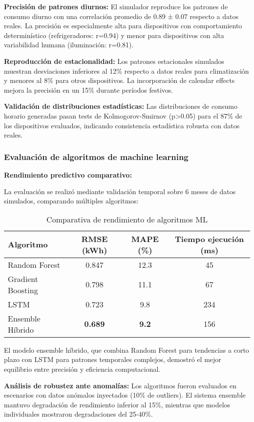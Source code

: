 \textbf{Precisión de patrones diurnos:} 
El simulador reproduce los patrones de consumo diurno con una correlación promedio de 0.89 ± 0.07 respecto a datos reales. La precisión es especialmente alta para dispositivos con comportamiento determinístico (refrigeradores: r=0.94) y menor para dispositivos con alta variabilidad humana (iluminación: r=0.81).

\textbf{Reproducción de estacionalidad:}
Los patrones estacionales simulados muestran desviaciones inferiores al 12\% respecto a datos reales para climatización y menores al 8\% para otros dispositivos. La incorporación de calendar effects mejora la precisión en un 15\% durante períodos festivos.

\textbf{Validación de distribuciones estadísticas:}
Las distribuciones de consumo horario generadas pasan tests de Kolmogorov-Smirnov (p>0.05) para el 87\% de los dispositivos evaluados, indicando consistencia estadística robusta con datos reales.

\subsubsection{Evaluación de algoritmos de machine learning}

\textbf{Rendimiento predictivo comparativo:}

La evaluación se realizó mediante validación temporal sobre 6 meses de datos simulados, comparando múltiples algoritmos:

\begin{table}[H]
\centering
\caption{Comparativa de rendimiento de algoritmos ML}
\begin{tabular}{lccc}
\toprule
\textbf{Algoritmo} & \textbf{RMSE (kWh)} & \textbf{MAPE (\%)} & \textbf{Tiempo ejecución (ms)} \\
\midrule
Random Forest & 0.847 & 12.3 & 45 \\
Gradient Boosting & 0.798 & 11.1 & 67 \\
LSTM & 0.723 & 9.8 & 234 \\
Ensemble Híbrido & \textbf{0.689} & \textbf{9.2} & 156 \\
\bottomrule
\end{tabular}
\end{table}

El modelo ensemble híbrido, que combina Random Forest para tendencias a corto plazo con LSTM para patrones temporales complejos, demostró el mejor equilibrio entre precisión y eficiencia computacional.

\textbf{Análisis de robustez ante anomalías:}
Los algoritmos fueron evaluados en escenarios con datos anómalos inyectados (10\% de outliers). El sistema ensemble mantuvo degradación de rendimiento inferior al 15\%, mientras que modelos individuales mostraron degradaciones del 25-40\%.

